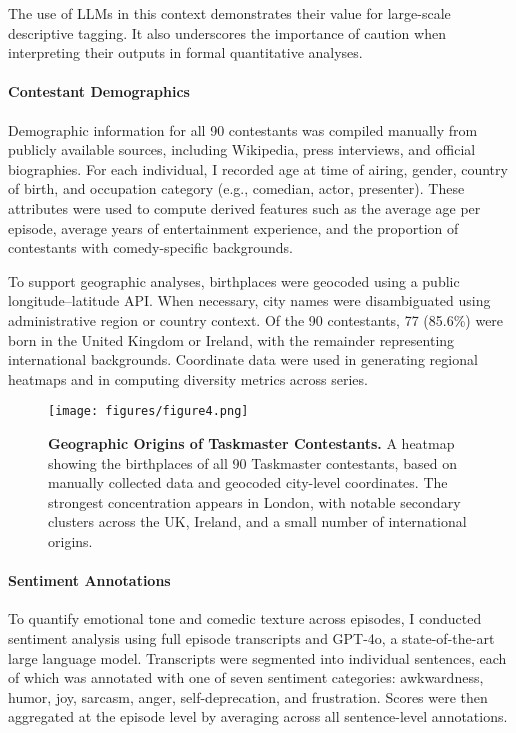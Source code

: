 \documentclass[10pt,letterpaper]{article}
\begin{document}
The use of LLMs in this context demonstrates their value for large-scale descriptive tagging. It also underscores the importance of caution when interpreting their outputs in formal quantitative analyses.

\paragraph{Contestant Demographics}
Demographic information for all 90 contestants was compiled manually from publicly available sources, including Wikipedia, press interviews, and official biographies. For each individual, I recorded age at time of airing, gender, country of birth, and occupation category (e.g., comedian, actor, presenter). These attributes were used to compute derived features such as the average age per episode, average years of entertainment experience, and the proportion of contestants with comedy-specific backgrounds.

To support geographic analyses, birthplaces were geocoded using a public longitude–latitude API. When necessary, city names were disambiguated using administrative region or country context. Of the 90 contestants, 77 (85.6\%) were born in the United Kingdom or Ireland, with the remainder representing international backgrounds. Coordinate data were used in generating regional heatmaps and in computing diversity metrics across series.

\begin{figure}[!h]
\centering
\texttt{[image: figures/figure4.png]}
\caption{{\bf Geographic Origins of Taskmaster Contestants.}
A heatmap showing the birthplaces of all 90 Taskmaster contestants, based on manually collected data and geocoded city-level coordinates. The strongest concentration appears in London, with notable secondary clusters across the UK, Ireland, and a small number of international origins.}
\label{fig:geo_origins}
\end{figure}
\FloatBarrier

\paragraph{Sentiment Annotations}
To quantify emotional tone and comedic texture across episodes, I conducted sentiment analysis using full episode transcripts and GPT-4o, a state-of-the-art large language model. Transcripts were segmented into individual sentences, each of which was annotated with one of seven sentiment categories: awkwardness, humor, joy, sarcasm, anger, self-deprecation, and frustration. Scores were then aggregated at the episode level by averaging across all sentence-level annotations.
\end{document}

